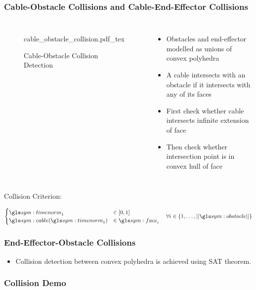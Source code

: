 \begin{frame}
	\frametitle{Cable-Obstacle Collisions and Cable-End-Effector Collisions}

	\begin{columns}
			\begin{figure}[hbt]
				\centering
				\def\svgwidth{\columnwidth}
				{cable_obstacle_collision.pdf_tex}
				\caption{Cable-Obstacle Collision Detection}%
				\label{fig:cable_obstacle_collision_detection}
			\end{figure}
			\begin{itemize}
				\item
					Obstacles and end-effector modelled as unions of convex
					polyhedra
				\item
					A cable intersects with an obstacle if it intersects with
					any of its faces
				\item
					First check whether cable intersects infinite extension of
					face
				\item
					Then check whether intersection point is in convex hull of
					face
			\end{itemize}
	\end{columns}

	Collision Criterion:

	\begin{equation*}
		\begin{cases}
			\timenorm_1 &\in [0, 1]\\
			\cable(\timenorm_1) &\in \face_i
		\end{cases}
		\quad \forall i \in \{1, \ldots, \norm{\obstacle}\}
		\label{eq:cable_obstacle_collision_condition}
	\end{equation*}

\end{frame}

\begin{frame}
	\frametitle{End-Effector-Obstacle Collisions}

	\begin{itemize}
		\item

			Collision detection between convex polyhedra is achieved using SAT
			theorem.
	\end{itemize}
\end{frame}

\begin{frame}
	\frametitle{Collision Demo}

\end{frame}
